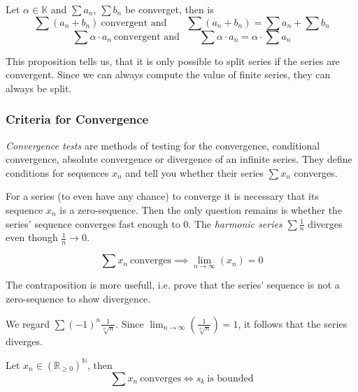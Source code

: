 \begin{proposition}\label{pro:series_calc_rules}
   Let \(\alpha \in \mathbb{K}\) and \(\sum a_n\), \(\sum b_n\) be converget, then is
   \[\sum (a_n + b_n)~\text{convergent and} \qquad \sum (a_n + b_n) = \sum a_n + \sum b_n\]
   \[\sum \alpha \cdot a_n~\text{convergent and} \qquad \sum \alpha \cdot a_n = \alpha \cdot \sum a_n\]
\end{proposition}
\begin{remark}
   This proposition tells us, that it is only possible to split series if the series are convergent.
   Since we can always compute the value of finite series, they can always be split.
\end{remark}

\subsubsection{Criteria for Convergence}
\emph{Convergence tests} are methods of testing for the convergence, conditional convergence, absolute convergence or divergence of an infinite series.
They define conditions for sequences \(x_n\) and tell you whether their series \(\sum x_n\) converges.

For a series (to even have any chance) to converge it is necessary that its sequence \(x_n\) is a zero-sequence.
Then the only question remains is whether the series' sequence converges fast enough to 0.
The \emph{harmonic series} \(\sum \frac{1}{n}\) diverges even though \(\frac{1}{n} \to 0\).
\begin{proposition}\label{pro:series_sequence_converge}
   \[\sum x_n~\text{converges} \implies \lim_{n \to \infty}(x_n) = 0\]
\end{proposition}
\begin{remark}[Tips]
   The contraposition is more usefull, i.e. prove that the series' sequence is not a zero-sequence to show divergence.
\end{remark}
\begin{example}
   We regard \(\sum (-1)^n\frac{1}{\sqrt[n]{n}}\).
   Since \(\lim_{n \to \infty} \left(\frac{1}{\sqrt[n]{n}}\right) = 1\), it follows that the series diverges.
\end{example}

\begin{theorem}\label{thm:convergence=bounded}
   Let \(x_n \in (\mathbb{R}_{\geq 0})^\mathbb{N}\), then
   \[\sum x_n~\text{converges} \iff s_k~\text{is bounded}\]
\end{theorem}

